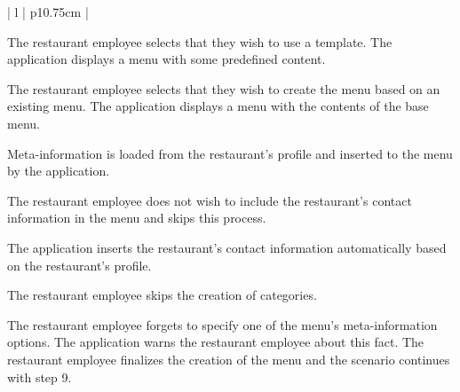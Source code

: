 \begin{center}
\begin{tabular}{| l | p{10.75cm} | }
\begin{minipage}[t]{\linewidth}
\begin{description}[nosep,after=\strut]
        \item [A1:] The restaurant employee selects that they wish to use a template. The application displays a menu with some predefined content.
        \item [A2:] The restaurant employee selects that they wish to create the menu based on an existing menu. The application displays a menu with the contents of the base menu.
        \item [A3:] Meta-information is loaded from the restaurant's profile and inserted to the menu by the application.
        \item [A4:] The restaurant employee does not wish to include the restaurant's contact information in the menu and skips this process. 
        \item [A5:] The application inserts the restaurant's contact information automatically based on the restaurant's profile.
        \item [A6:] The restaurant employee skips the creation of categories.
        \item [A7:] The restaurant employee forgets to specify one of the menu's meta-information options. The application warns the restaurant employee about this fact. The restaurant employee finalizes the creation of the menu and the scenario continues with step 9.
      \end{description}
    \end{minipage}
    \\
    \hline
  \end{tabular}
  \newline
\end{center}

\newpage


